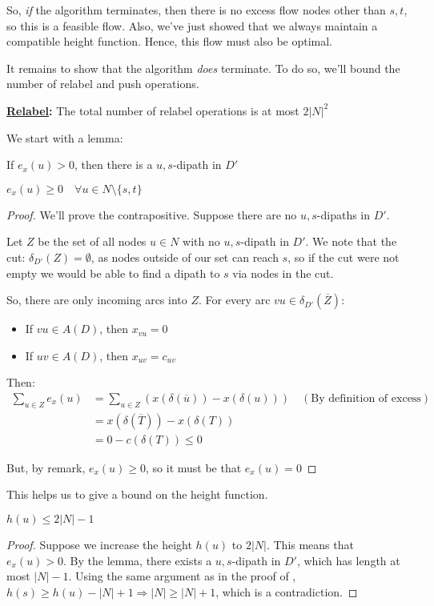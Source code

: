 So, \textit{if} the algorithm terminates, then there is no excess flow nodes other than $s,t$, so this is a feasible flow.
Also, we've just showed that we always maintain a compatible height function.
Hence, this flow must also be optimal.

It remains to show that the algorithm \textit{does} terminate.
To do so, we'll bound the number of relabel and push operations.

\textbf{\underline{Relabel}:} The total number of relabel operations is at most $2|N|^2$

We start with a lemma:
\begin{lemma}{}{}
    If $e_x(u) > 0$, then there is a $u,s$-dipath in $D'$
\end{lemma}
\begin{remark}
    $e_x(u) \geq 0 \quad \forall u \in N \setminus\{s,t\}$ 
\end{remark}
\begin{proof}
    We'll prove the contrapositive. Suppose there are no $u,s$-dipaths in $D'$.

    Let $Z$ be the set of all nodes $u \in N$ with no $u,s$-dipath in $D'$. We note that the cut: $\delta_{D'}(Z) = \emptyset$, as nodes outside of our set can reach $s$, so if the cut were not empty we would be able to find a dipath to $s$ via nodes in the cut.

    So, there are only incoming arcs into $Z$. For every arc $vu \in \delta_{D'}(\overline{Z})$:
    \begin{itemize}
        \item If $vu \in A(D)$, then $x_{vu} = 0$
        \item If $uv \in A(D)$, then $x_{uv} = c_{uv}$ 
    \end{itemize}

    Then:
    \begin{align*}
        \sum_{u \in Z} e_x(u) &= \sum_{u \in Z} (x(\delta(\overline{u})) - x(\delta(u))) \quad (\text{By definition of excess}) \\
        &= x(\delta(\overline{T})) - x(\delta(T)) \\
        &= 0 - c(\delta(T)) \leq 0
    \end{align*}
    
    But, by remark, $e_x(u) \geq 0$, so it must be that $e_x(u) = 0$
\end{proof}

This helps us to give a bound on the height function.
\begin{proposition}{}{}
    $h(u) \leq 2|N| - 1$
\end{proposition}
\begin{proof}
    Suppose we increase the height $h(u)$ to $2|N|$.
    This means that $e_x(u) > 0$.
    By the lemma, there exists a $u,s$-dipath in $D'$, which has length at most $|N| - 1$.
    Using the same argument as in the proof of , $h(s) \geq h(u) - |N| + 1 \Rightarrow |N| \geq |N| + 1$, which is a contradiction. 
\end{proof}

